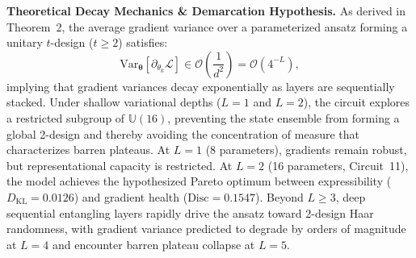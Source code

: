 \documentclass[journal]{IEEEtran}
\begin{document}
\textbf{Theoretical Decay Mechanics \& Demarcation Hypothesis.}
As derived in Theorem~2, the average gradient variance over a parameterized ansatz forming a unitary $t$-design ($t \ge 2$) satisfies:
\begin{equation}
\mathrm{Var}_{\boldsymbol{\theta}}\left[ \partial_{\theta_k} \mathcal{L} \right] \in \mathcal{O}\left( \frac{1}{d^2} \right) = \mathcal{O}\left( 4^{-L} \right),
\end{equation}
implying that gradient variances decay exponentially as layers are sequentially stacked. Under shallow variational depths ($L=1$ and $L=2$), the circuit explores a restricted subgroup of $\mathbb{U}(16)$, preventing the state ensemble from forming a global 2-design and thereby avoiding the concentration of measure that characterizes barren plateaus. At $L=1$ (8 parameters), gradients remain robust, but representational capacity is restricted. At $L=2$ (16 parameters, Circuit~11), the model achieves the hypothesized Pareto optimum between expressibility ($D_{\mathrm{KL}} = 0.0126$) and gradient health ($\mathrm{Disc} = 0.1547$). Beyond $L \ge 3$, deep sequential entangling layers rapidly drive the ansatz toward 2-design Haar randomness, with gradient variance predicted to degrade by orders of magnitude at $L=4$ and encounter barren plateau collapse at $L=5$.
\end{document}
